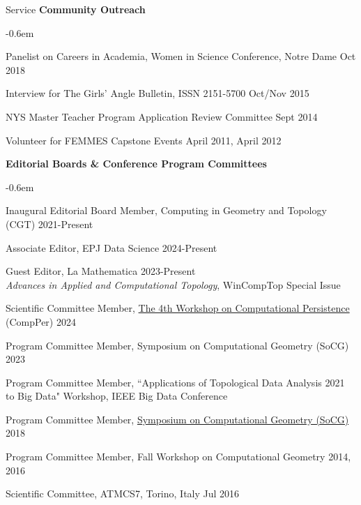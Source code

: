 \documentclass{resume} %
\begin{document}
\begin{rSection}{Service}
\textbf{Community Outreach}
\begin{list}{}{\leftmargin=1em}
   \itemsep -0.6em \vspace{-0.5em} %
\item
Panelist on Careers in Academia, Women in Science Conference, Notre Dame \hfill Oct 2018
\item Interview for The Girls' Angle Bulletin,  ISSN 2151-5700 \hfill Oct/Nov 2015
\item
{NYS Master Teacher Program Application Review Committee} \hfill Sept 2014
\item
{Volunteer for FEMMES  Capstone Events} \hfill April 2011, April 2012
\end{list}

\textbf{Editorial Boards \& Conference Program Committees}

\begin{list}{}{\leftmargin=1em}
   \itemsep -0.6em \vspace{-0.5em} %
   \item Inaugural Editorial Board Member, Computing in Geometry and Topology (CGT)  \hfill 2021-Present
   \item Associate Editor, EPJ Data Science \hfill 2024-Present
   \item Guest Editor, La Mathematica \hfill 2023-Present\\ 
   \phantom{MMM}\textit{Advances in Applied and Computational Topology}, WinCompTop Special Issue 
\item
Scientific Committee Member, \href{https://comper2024.tugraz.at}{The 4th Workshop on Computational Persistence} (CompPer) \hfill 2024
\item
Program Committee Member, Symposium on Computational Geometry (SoCG) \hfill 2023
\item
Program Committee Member, ``Applications of Topological Data Analysis \hfill 2021\\
\phantom{MMM}to Big Data" Workshop, IEEE Big Data Conference
\item
Program Committee Member, \href{https://www.renyi.hu/conferences/socg18/}{Symposium on Computational Geometry (SoCG)} \hfill 2018
\item {Program Committee Member, Fall Workshop on Computational Geometry} \hfill 2014, 2016
\item
{Scientific Committee,
ATMCS7, Torino, Italy} \hfill Jul 2016\\
 \phantom{MMM}{Applied Topology: Methods, Computation, and Science}
\end{list}





\end{rSection}
\end{document}

